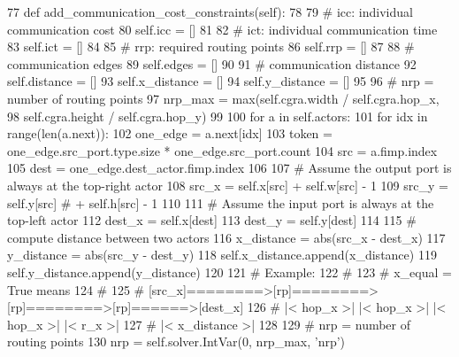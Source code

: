 \begin{DoxyCode}
77     \textcolor{keyword}{def }add\_communication\_cost\_constraints(self):
78 
79         \textcolor{comment}{# icc: individual communication cost}
80         self.icc = []
81 
82         \textcolor{comment}{# ict: individual communication time}
83         self.ict = []
84 
85         \textcolor{comment}{# rrp: required routing points}
86         self.rrp = []
87 
88         \textcolor{comment}{# communication edges}
89         self.edges = []
90 
91         \textcolor{comment}{# communication distance}
92         self.distance = []
93         self.x\_distance = []
94         self.y\_distance = []
95 
96         \textcolor{comment}{# nrp = number of routing points}
97         nrp\_max = max(self.cgra.width / self.cgra.hop\_x,
98                       self.cgra.height / self.cgra.hop\_y)
99 
100         \textcolor{keywordflow}{for} a \textcolor{keywordflow}{in} self.actors:
101             \textcolor{keywordflow}{for} idx \textcolor{keywordflow}{in} range(len(a.next)):
102                 one\_edge = a.next[idx]
103                 token = one\_edge.src\_port.type.size * one\_edge.src\_port.count
104                 src = a.fimp.index
105                 dest = one\_edge.dest\_actor.fimp.index
106 
107                 \textcolor{comment}{# Assume the output port is always at the top-right actor}
108                 src\_x = self.x[src] + self.w[src] - 1
109                 src\_y = self.y[src]  \textcolor{comment}{# + self.h[src] - 1}
110 
111                 \textcolor{comment}{# Assume the input port is always at the top-left actor}
112                 dest\_x = self.x[dest]
113                 dest\_y = self.y[dest]
114 
115                 \textcolor{comment}{# compute distance between two actors}
116                 x\_distance = abs(src\_x - dest\_x)
117                 y\_distance = abs(src\_y - dest\_y)
118                 self.x\_distance.append(x\_distance)
119                 self.y\_distance.append(y\_distance)
120 
121                 \textcolor{comment}{# Example:}
122                 \textcolor{comment}{#}
123                 \textcolor{comment}{# x\_equal = True means}
124                 \textcolor{comment}{#}
125                 \textcolor{comment}{# [src\_x]========>[rp]========>[rp]========>[rp]======>[dest\_x]}
126                 \textcolor{comment}{#     |< hop\_x >|  |< hop\_x >|  |< hop\_x >|  |< r\_x >|}
127                 \textcolor{comment}{#     |< x\_distance                 >|}
128 
129                 \textcolor{comment}{# nrp = number of routing points}
130                 nrp = self.solver.IntVar(0, nrp\_max, \textcolor{stringliteral}{'nrp'})

\end{DoxyCode}
